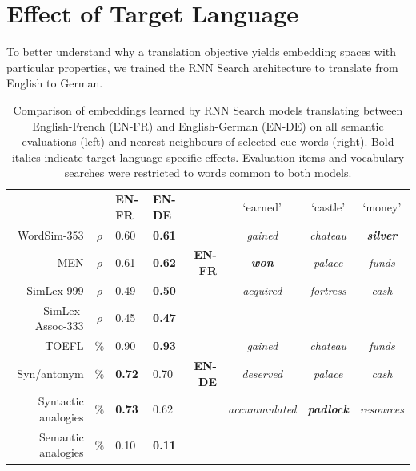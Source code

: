 \section{Effect of Target Language}
\label{lang_effects}

To better understand why a translation objective yields embedding spaces with particular properties, we trained the RNN Search architecture to translate from English to German. 

\begin{table}[ht]
\begin{center}
\begin{tabular}{r c | m{0.9cm}  m{0.9cm}  r c c c }
    \multicolumn{2}{c|}{~} &\bf  \small EN-FR &\bf  \small EN-DE &  &  `earned' & `castle' & `money'\\ 
\cline{1-4} \cline{6-8}
WordSim-353   & \(\rho\) & 0.60 & \bf 0.61 &   & {\small \emph{gained}} & {\small \emph{chateau}} & {\small \bf \emph{ silver}} \\
MEN & \(\rho\) & 0.61 & \bf 0.62 \bf & \bf \small  EN-FR  & {\small \bf \emph{won}} & {\small \emph{palace}} & {\small \emph{funds}} \\
SimLex-999 & \(\rho\) & 0.49 &  \bf 0.50 &  & {\small \emph{acquired}}  & {\small \emph{fortress}}  & {\small \emph{cash}} \\
\cline{6-8}
SimLex-Assoc-333 & \(\rho\) & 0.45  & \bf 0.47   &   &  &   \\
TOEFL & \(\%\) & 0.90 & \bf 0.93  & &  {\small \emph{gained}}&  {\small \emph{chateau}} &  {\small \emph{funds}} \\ 
Syn/antonym & \(\%\) & \bf 0.72 &  0.70  &  \bf \small EN-DE   &  {\small \emph{deserved}}    &  {\small \emph{palace}}    &  {\small \emph{cash}} \\ 
Syntactic analogies & \(\%\) & \bf 0.73 & 0.62   &  &  {\small \emph{accummulated}}   &  {\small \bf \emph{ padlock}}   &  {\small \emph{resources}} \\  
Semantic analogies & \(\%\) & 0.10 & \bf  0.11  \\
\end{tabular}
\caption{Comparison of embeddings learned by RNN Search models translating between English-French (EN-FR) and English-German (EN-DE) on all semantic evaluations (left) and nearest neighbours of selected cue words (right). Bold italics indicate target-language-specific effects. Evaluation items and vocabulary searches were restricted to words common to both models. }
\label{table:de}
\end{center}
\vspace{-5mm}
\end{table}

